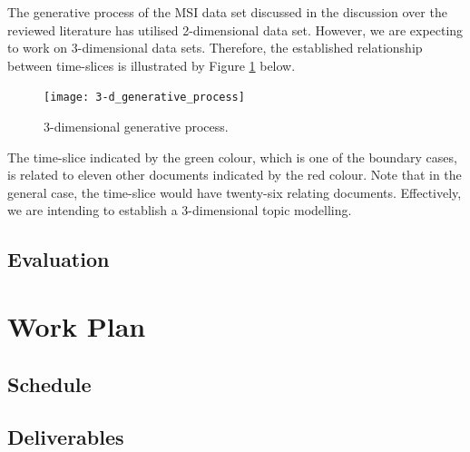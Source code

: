 \documentclass{mprop}
\begin{document}
\par The generative process of the MSI data set discussed in the discussion over the reviewed literature has utilised 2-dimensional data set. However, we are expecting to work on 3-dimensional data sets. Therefore, the established relationship between time-slices is illustrated by Figure \ref{fig:3-d_generative_process} below.
\begin{figure}[H]
  \centering
  \texttt{[image: 3-d\_generative\_process]}
  \caption{3-dimensional generative process.}
  \label{fig:3-d_generative_process}
\end{figure}
The time-slice indicated by the green colour, which is one of the boundary cases, is related to eleven other documents indicated by the red colour. Note that in the general case, the time-slice would have twenty-six relating documents. Effectively, we are intending to establish a 3-dimensional topic modelling.  

\par


\subsection{Evaluation}

\par

\section{Work Plan}

\par

\subsection{Schedule}

\subsection{Deliverables}

\par 



\end{document}
